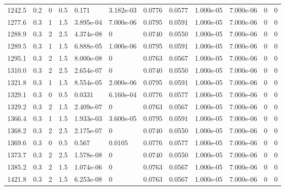 \documentclass[preview]{standalone}
\begin{document}
{{{\begin{tabular}{L{1.2cm}C{1.2cm} C{0.3cm}C{0.5cm} C{1.4cm}C{1.4cm} C{1.4cm}C{1.4cm} C{1.6cm}C{1.6cm} C{1.6cm}C{1.6cm}}
  1242.5  &   0.2  & 0     & 0.5 &  0.171  & 3.182e-03  &  0.0776&   0.0577& 1.000e-05 & 7.000e-06   &  0 & 0  \\ 
  1277.6  &   0.3  & 1     & 1.5 &  3.895e-04  & 7.000e-06  &  0.0795&   0.0591& 1.000e-05 & 7.000e-06   &  0 & 0  \\ 
  1288.9  &   0.3  & 2     & 2.5 &  4.374e-08  & 0  &  0.0740&   0.0550& 1.000e-05 & 7.000e-06   &  0 & 0  \\ 
  1289.5  &   0.3  & 1     & 1.5 &  6.888e-05  & 1.000e-06  &  0.0795&   0.0591& 1.000e-05 & 7.000e-06   &  0 & 0  \\ 
  1295.1  &   0.3  & 2     & 1.5 &  8.000e-08  & 0  &  0.0763&   0.0567& 1.000e-05 & 7.000e-06   &  0 & 0  \\ 
  1310.0  &   0.3  & 2     & 2.5 &  2.654e-07  & 0  &  0.0740&   0.0550& 1.000e-05 & 7.000e-06   &  0 & 0  \\ 
  1321.8  &   0.3  & 1     & 1.5 &  8.554e-05  & 2.000e-06  &  0.0795&   0.0591& 1.000e-05 & 7.000e-06   &  0 & 0  \\ 
  1329.1  &   0.3  & 0     & 0.5 &  0.0331  & 6.160e-04  &  0.0776&   0.0577& 1.000e-05 & 7.000e-06   &  0 & 0  \\ 
  1329.2  &   0.3  & 2     & 1.5 &  2.409e-07  & 0  &  0.0763&   0.0567& 1.000e-05 & 7.000e-06   &  0 & 0  \\ 
  1366.4  &   0.3  & 1     & 1.5 &  1.933e-03  & 3.600e-05  &  0.0795&   0.0591& 1.000e-05 & 7.000e-06   &  0 & 0  \\ 
  1368.2  &   0.3  & 2     & 2.5 &  2.175e-07  & 0  &  0.0740&   0.0550& 1.000e-05 & 7.000e-06   &  0 & 0  \\ 
  1369.6  &   0.3  & 0     & 0.5 &  0.567  & 0.0105  &  0.0776&   0.0577& 1.000e-05 & 7.000e-06   &  0 & 0  \\ 
  1373.7  &   0.3  & 2     & 2.5 &  1.578e-08  & 0  &  0.0740&   0.0550& 1.000e-05 & 7.000e-06   &  0 & 0  \\ 
  1385.2  &   0.3  & 2     & 1.5 &  1.074e-06  & 0  &  0.0763&   0.0567& 1.000e-05 & 7.000e-06   &  0 & 0  \\ 
  1421.8  &   0.3  & 2     & 1.5 &  6.253e-08  & 0  &  0.0763&   0.0567& 1.000e-05 & 7.000e-06   &  0 & 0  \\ 
\hline 
\end{tabular} 

}}}
\end{document}
